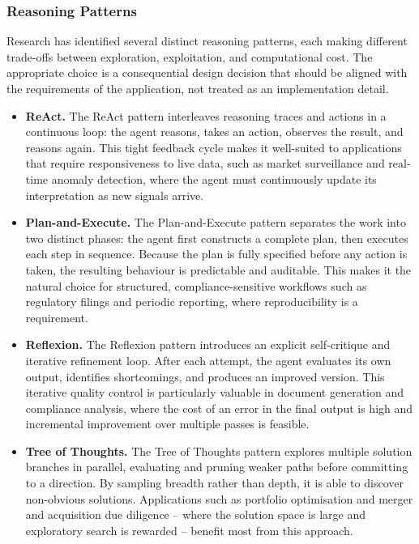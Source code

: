 \documentclass{article}
\begin{document}
\subsubsection{Reasoning Patterns}

Research has identified several distinct reasoning patterns, each making
different trade-offs between exploration, exploitation, and computational cost.
The appropriate choice is a consequential design decision that should be
aligned with the requirements of the application, not treated as an
implementation detail.

\begin{itemize}
    \item{\textbf{ReAct.}} The ReAct pattern \cite{yao2022react} interleaves reasoning traces and actions in a continuous loop: the agent reasons, takes an action, observes the result, and reasons again. This tight feedback cycle makes it well-suited to applications that require responsiveness to live data, such as market surveillance and real-time anomaly detection, where the agent must continuously update its interpretation as new signals arrive.

    \item{\textbf{Plan-and-Execute.}} The Plan-and-Execute pattern \cite{wang2023plan} separates the work into two distinct phases: the agent first constructs a complete plan, then executes each step in sequence. Because the plan is fully specified before any action is taken, the resulting behaviour is predictable and auditable. This makes it the natural choice for structured, compliance-sensitive workflows such as regulatory filings and periodic reporting, where reproducibility is a requirement.

    \item{\textbf{Reflexion.}} The Reflexion pattern \cite{shinn2023reflexion} introduces an explicit self-critique and iterative refinement loop. After each attempt, the agent evaluates its own output, identifies shortcomings, and produces an improved version. This iterative quality control is particularly valuable in document generation and compliance analysis, where the cost of an error in the final output is high and incremental improvement over multiple passes is feasible.

    \item{\textbf{Tree of Thoughts.}} The Tree of Thoughts pattern \cite{yao2023tree} explores multiple solution branches in parallel, evaluating and pruning weaker paths before committing to a direction. By sampling breadth rather than depth, it is able to discover non-obvious solutions. Applications such as portfolio optimisation and merger and acquisition due diligence -- where the solution space is large and exploratory search is rewarded -- benefit most from this approach.


\end{itemize}
\end{document}
